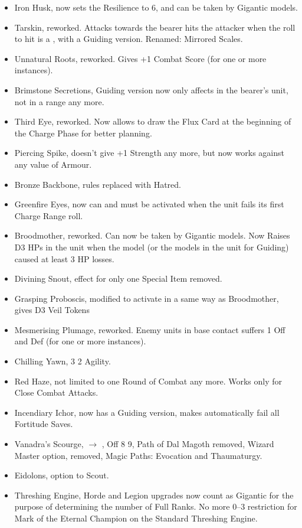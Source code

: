 \begin{itemize}
\item Iron Husk, now sets the Resilience to 6, and can be taken by Gigantic models.
\item Tarskin, reworked. Attacks towards the bearer hits the attacker when the roll to hit is a , with a Guiding version. Renamed: Mirrored Scales.
\item Unnatural Roots, reworked. Gives +1 Combat Score (for one or more instances).
\item Brimstone Secretions, Guiding version now only affects \rnf{} in the bearer's unit, not in a  range any more.
\item Third Eye, reworked. Now allows to draw the Flux Card at the beginning of the Charge Phase for better planning.
\item Piercing Spike, doesn't give +1 Strength any more, but now works against any value of Armour.
\item Bronze Backbone, rules replaced with Hatred.
\item Greenfire Eyes, now can and must be activated when the unit fails its first Charge Range roll.
\item Broodmother, reworked. Can now be taken by Gigantic models. Now Raises D3 HPs in the unit when the model (or the \rnf{} models in the unit for Guiding) caused at least 3 HP losses.
\item Divining Snout, effect for only one Special Item removed.
\item Grasping Proboscis, modified to activate in a same way as Broodmother, gives D3 Veil Tokens
\item Mesmerising Plumage, reworked. Enemy units in base contact suffers \minuss{}1 Off and Def (for one or more instances).
\item Chilling Yawn, \minuss{}3 \baddown{} \minuss{}2 Agility.
\item Red Haze, not limited to one Round of Combat any more. Works only for Close Combat Attacks.
\item Incendiary Ichor, now has a Guiding version, makes automatically fail all Fortitude Saves.
\item Vanadra's Scourge,  $\rightarrow$ , Off 8 \goodup{} 9, Path of Dal Magoth removed, Wizard Master option, removed, Magic Paths: Evocation and Thaumaturgy.
\item Eidolons, option to Scout.
\item Threshing Engine, Horde and Legion upgrades now count as Gigantic for the purpose of determining the number of Full Ranks. No more 0--3 restriction for Mark of the Eternal Champion on the Standard Threshing Engine.

\end{itemize}
